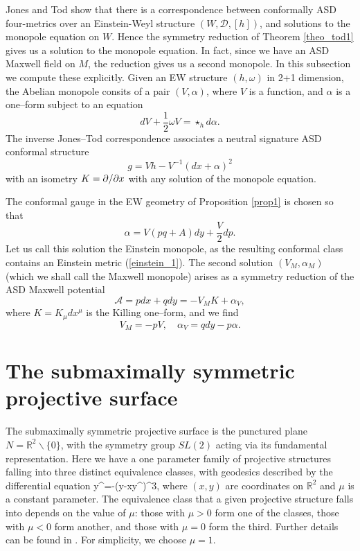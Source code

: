Jones and Tod \cite{JT} show that there is a correspondence between conformally ASD four-metrics over an Einstein-Weyl structure $(W,\mathcal{D},[h])$, and solutions to the monopole equation on $W$. Hence the symmetry reduction of Theorem
\ref{theo_tod1} gives us a solution to the monopole equation. In fact, since we have an ASD Maxwell field on $M$, the reduction gives us a second monopole. In this subsection we compute these explicitly.
Given an EW structure $(h, \omega)$ in 2+1 dimension, the Abelian monopole consits
of a pair $(V, \alpha)$, where $V$ is a function, and $\alpha$ is a one--form subject to an equation
\[
dV+\frac{1}{2}\omega V=\star_h d\alpha.
\]
The inverse Jones--Tod correspondence \cite{JT} associates a neutral signature 
ASD conformal structure
\[
g=Vh-V^{-1}(dx +\alpha)^2
\]
with an isometry $K=\partial/\partial x$ with any solution of the monopole equation.


The conformal gauge in the EW geometry of Proposition \ref{prop1} 
is chosen so that 
\[
\alpha=V( pq+A)dy+\frac{V}{2}dp.
\]
Let us call this solution the Einstein monopole, as the resulting conformal class contains an Einstein metric
(\ref{einstein_1}). The second solution $(V_M, \alpha_M)$ (which we shall call the Maxwell monopole)
arises
as a symmetry reduction of the ASD Maxwell potential
\[
{\mathcal A}=pdx+qdy=-V_M K+\alpha_V,
\]
where $K=K_{\mu}dx^{\mu}$ is the Killing one--form, and
we find
\[
V_M=-pV, \quad \alpha_V=qdy-p\alpha.
\]
\section{The submaximally symmetric projective surface}
\label{neat}
The submaximally symmetric projective surface is the punctured plane $N=\mathbb{R}^2\backslash\{0\}$, with the symmetry group $SL(2)$ acting via its fundamental representation. Here we have a one parameter family of projective structures falling into three distinct equivalence classes, with geodesics described by the differential equation
\be
\label{neatODE}
y^{\prime \prime}=-\mu(y-xy^\prime)^3,
\ee
where $(x,y)$ are coordinates on $\mathbb{R} ^2$ and $\mu$ is a constant parameter. The equivalence class that a given projective structure falls into depends on the value of $\mu$: those with $\mu>0$ form one of the classes, those with $\mu<0$ form another, and those with $\mu=0$ form the third. Further details can be found in \cite{Bryant}. For simplicity, we choose $\mu=1$.

